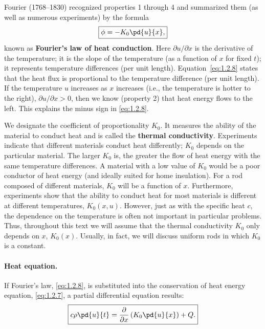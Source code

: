 Fourier (1768--1830) recognized properties 1 through 4 and summarized them (as well as numerous experiments) by the formula
\begin{equation}
\boxed{\phi = -K_0 \pd{u}{x},}
\label{eq:1.2.8}
\end{equation}
known as \textbf{Fourier's law of heat conduction}. Here $\partial u/\partial x$ is the derivative of the temperature; it is the slope of the temperature (as a function of $x$ for fixed $t$); it represents temperature differences (per unit length). Equation~\eqref{eq:1.2.8} states that the heat flux is proportional to the temperature difference (per unit length). If the temperature $u$ increases as $x$ increases (i.e., the temperature is hotter to the right), $\partial u/\partial x > 0$, then we know (property 2) that heat energy flows to the left. This explains the minus sign in \eqref{eq:1.2.8}.

We designate the coefficient of proportionality $K_0$. It measures the ability of the material to conduct heat and is called the \textbf{thermal conductivity}. Experiments indicate that different materials conduct heat differently; $K_0$ depends on the particular material. The larger $K_0$ is, the greater the flow of heat energy with the same temperature differences. A material with a low value of $K_0$ would be a poor conductor of heat energy (and ideally suited for home insulation). For a rod composed of different materials, $K_0$ will be a function of $x$. Furthermore, experiments show that the ability to conduct heat for most materials is different at different temperatures, $K_0(x, u)$. However, just as with the specific heat $c$, the dependence on the temperature is often not important in particular problems. Thus, throughout this text we will assume that the thermal conductivity $K_0$ only depends on $x$, $K_0(x)$. Usually, in fact, we will discuss uniform rods in which $K_0$ is a constant.

\paragraph{Heat equation.}
If Fourier's law, \eqref{eq:1.2.8}, is substituted into the conservation of heat energy equation, \eqref{eq:1.2.7}, a partial differential equation results:
\begin{equation}
\boxed{c\rho\pd{u}{t} = \frac{\partial}{\partial x}\left(K_0 \pd{u}{x}\right) + Q.}
\label{eq:1.2.9}
\end{equation}

